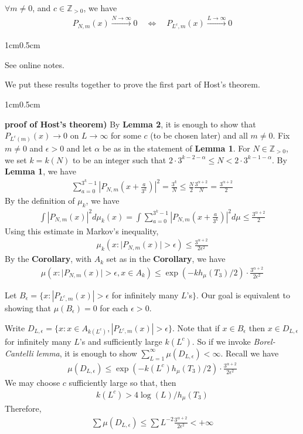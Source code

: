 \documentclass[12pt,a4paper]{report}
\newenvironment{proof}
{\begin{changemargin}{1cm}{0.5cm} 
	}%
	{\end{changemargin}
}
\begin{document}
 $\forall m\neq 0$, and $c\in \mathbb{Z}_{>0}$, we have
\begin{align*}
P_{N,m}(x) \xrightarrow{N\rightarrow \infty} 0 \quad \Leftrightarrow \quad P_{L^c, m} (x) \xrightarrow{L\rightarrow \infty} 0
\end{align*}
\begin{proof}
\pf See online notes.
\end{proof}
\s

We put these results together to prove the first part of Host's theorem.
\s

\begin{proof}
\textbf{proof of Host's theorem)} By \textbf{Lemma 2}, it is enough to show that $P_{L^c(m)}(x) \rightarrow 0$ on $L\rightarrow \infty$ for some $c$ (to be chosen later) and all $m\neq 0$. Fix $m\neq 0$ and $\epsilon>0$ and let $\alpha$ be as in the statement of \textbf{Lemma 1}. For $N\in \mathbb{Z}_{>0}$, we set $k =k(N)$ to be an integer such that $2\cdot 3^{k-2-\alpha} \leq N < 2\cdot 3^{k-1-\alpha}$. By \textbf{Lemma 1}, we have
\begin{align*}
\sum_{a=0}^{3^k-1} |P_{N,m}(x + \frac{a}{3^k})|^2 = \frac{3^k}{N} \leq \frac{N}{2} \frac{3^{\alpha+2}}{N} = \frac{3^{\alpha+2}}{2}
\end{align*}
By the definition of $\mu_{k}$, we have
\begin{align*}
\int |P_{N,m}(x)|^2 d\mu_k(x) = \int \sum_{a=0}^{3^k -1}|P_{N,m}(x+ \frac{a}{3^k})|^2 d\mu \leq \frac{3^{\alpha+2}}{2}
\end{align*}
Using this estimate in Markov's inequality,
\begin{align*}
\mu_k(x : \big| P_{N,m}(x)\big| > \epsilon) \leq \frac{3^{\alpha +2}}{2\epsilon^2}
\end{align*}
By the \textbf{Corollary}, with $A_k$ set as in the \textbf{Corollary}, we have
\begin{align*}
\mu(x : \big| P_{N,m}(x) \big| > \epsilon, x\in A_k ) \leq \exp(-k h_{\mu} (T_3)/2) \cdot \frac{3^{\alpha+2}}{2\epsilon^2}
\end{align*}
\s

Let $B_{\epsilon} = \{ x: |P_{L^c,m}(x)|>\epsilon$ for infinitely many $L$'s$\}$. Our goal is equivalent to showing that $\mu(B_{\epsilon}) =0$ for each $\epsilon>0$. 

\quad Write $D_{L,\epsilon} = \{ x: x\in A_{k(L^c)}, |P_{L^c,m}(x)|>\epsilon \}$. Note that if $x\in B_{\epsilon}$ then $x\in D_{L,\epsilon}$ for infinitely many $L$'s and sufficiently large $k(L^c)$. So if we invoke \emph{Borel-Cantelli lemma}, it is enough to show $\sum_{L=1}^{\infty} \mu(D_{L,\epsilon}) < \infty$. Recall we have
\begin{align*}
\mu(D_{L,\epsilon}) \leq \exp( - k(L^c) h_{\mu}(T_3)/2) \cdot \frac{3^{\alpha +2}}{2\epsilon^2}
\end{align*}
We may choose $c$ sufficiently large so that, then
\begin{align*}
k(L^c) > 4 \log (L)/ h_{\mu}(T_3)
\end{align*}
Therefore,
\begin{align*}
\sum \mu(D_{L,\epsilon}) \leq \sum L^{-2} \frac{3^{\alpha +2}}{2\epsilon^2} < +\infty
\end{align*}
\eop
\end{proof}
\end{document}
